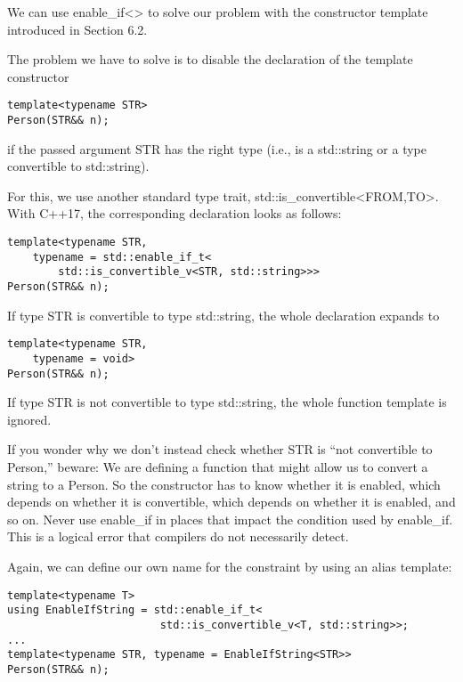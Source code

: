 We can use enable\_if<> to solve our problem with the constructor template introduced in Section 6.2.

The problem we have to solve is to disable the declaration of the template constructor

\begin{lstlisting}[style=styleCXX]
template<typename STR>
Person(STR&& n);
\end{lstlisting}

if the passed argument STR has the right type (i.e., is a std::string or a type convertible to std::string).

For this, we use another standard type trait, std::is\_convertible<FROM,TO>. With C++17, the corresponding declaration looks as follows:

\begin{lstlisting}[style=styleCXX]
template<typename STR,
	typename = std::enable_if_t<
		std::is_convertible_v<STR, std::string>>>
Person(STR&& n);
\end{lstlisting}

If type STR is convertible to type std::string, the whole declaration expands to

\begin{lstlisting}[style=styleCXX]
template<typename STR,
	typename = void>
Person(STR&& n);
\end{lstlisting}

If type STR is not convertible to type std::string, the whole function template is ignored.

\begin{tcolorbox}[colback=webgreen!5!white,colframe=webgreen!75!black]
\hspace*{0.75cm}If you wonder why we don’t instead check whether STR is “not convertible to Person,” beware: We are defining a function that might allow us to convert a string to a Person. So the constructor has to know whether it is enabled, which depends on whether it is convertible, which depends on whether it is enabled, and so on. Never use enable\_if in places that impact the condition used by enable\_if. This is a logical error that compilers do not necessarily detect.
\end{tcolorbox}

Again, we can define our own name for the constraint by using an alias template:

\begin{lstlisting}[style=styleCXX]
template<typename T>
using EnableIfString = std::enable_if_t<
						std::is_convertible_v<T, std::string>>;
...
template<typename STR, typename = EnableIfString<STR>>
Person(STR&& n);
\end{lstlisting}

